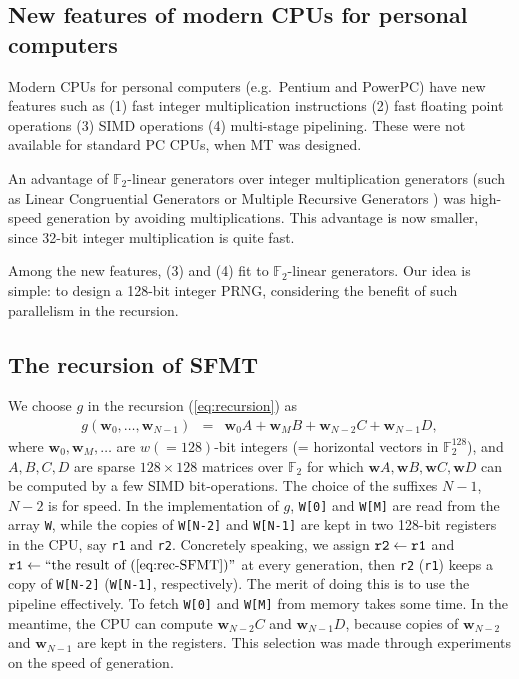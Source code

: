 \documentclass[acmnow]{acmtrans2m}
\def\F2{{\mathbb F}_2}
\def\bw{{{\mathbf w}}}
\begin{document}
\subsection{New features of modern CPUs for personal computers}
Modern CPUs for personal computers (e.g.\ Pentium and
PowerPC) have new features such as 
(1) fast integer multiplication instructions
(2) fast floating point operations 
(3) SIMD operations 
(4) multi-stage pipelining.
These were not available 
for standard PC CPUs, when MT was designed.

An advantage of $\F2$-linear generators 
over integer multiplication generators 
(such as Linear Congruential Generators \cite{knuth:bible}
or Multiple Recursive Generators \cite{MRG})
was high-speed generation by avoiding multiplications.
This advantage is now smaller, since 
32-bit integer multiplication is quite fast. 

Among the new features,
(3) and (4) fit to $\F2$-linear generators. 
Our idea is simple: to design
a 128-bit integer PRNG, considering
the benefit of such parallelism in the recursion.

\subsection{The recursion of SFMT}
We choose $g$ in the recursion (\ref{eq:recursion}) as
\begin{eqnarray}\label{eq:rec-SFMT}
g(\bw_0,\ldots,\bw_{N-1}) 
&=& \bw_0A + \bw_MB + \bw_{N-2}C + \bw_{N-1}D,
\end{eqnarray}
where 
$\bw_0, \bw_M, \ldots$ are $w(=128)$-bit integers 
(= horizontal vectors in $\F2^{128}$),
and $A, B, C, D$ are sparse $128 \times 128$ matrices
over $\F2$ for which 
$\bw A, \bw B, \bw C, \bw D$ can be computed by
a few SIMD bit-operations.
The choice of the suffixes $N-1$, $N-2$ is for  
speed. In the implementation of $g$, 
{\tt W[0]} and {\tt W[M]} are read from the array
{\tt W}, while the copies of 
{\tt W[N-2]} and {\tt W[N-1]}
are kept in 
two 128-bit registers in the CPU, 
say {\tt r1} and {\tt r2}. Concretely speaking, we assign 
${\tt r2} \leftarrow {\tt r1}$ and
${\tt r1} \leftarrow \mbox{``the result of (\ref{eq:rec-SFMT})''}$
at every generation, then {\tt r2} ({\tt r1}) keeps
a copy of {\tt W[N-2]} ({\tt W[N-1]}, respectively). 
The merit of doing this is to use the pipeline effectively. To fetch 
{\tt W[0]} and {\tt W[M]} from memory takes some
time. In the meantime, the
CPU can compute $\bw_{N-2}C$ and $\bw_{N-1}D$,
because copies of $\bw_{N-2}$ and $\bw_{N-1}$ are kept 
in the registers. This selection was made through experiments
on the speed of generation.
\end{document}
